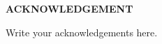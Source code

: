 
\parbox[1in]{4in}{}

\begin{center}
\textbf{\Large ACKNOWLEDGEMENT}
\end{center}

\vspace{1cm}


Write your acknowledgements here.



\vspace{1.5cm}
\hfill {\sname}